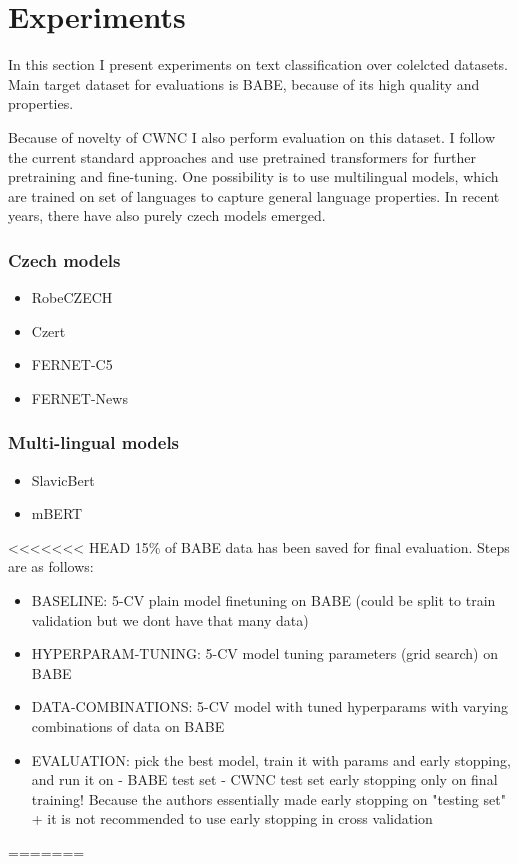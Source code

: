 \chapter{Experiments}\label{experiments}
In this section I present experiments on text classification over colelcted datasets. Main target dataset for evaluations is BABE, because of its high quality and properties.

Because of novelty of CWNC I also perform evaluation on this dataset.
I follow the current standard approaches and use pretrained transformers for further pretraining and fine-tuning. One possibility is to use multilingual models, which are trained on set of languages to capture general language properties. In recent years, there have also purely czech models emerged.
\subsection{Czech models}
\begin{itemize}
    \item RobeCZECH
    \item Czert
    \item FERNET-C5
    \item FERNET-News
\end{itemize}


\subsection{Multi-lingual models}
\begin{itemize}
    \item SlavicBert
    \item mBERT
\end{itemize}


<<<<<<< HEAD
 15\% of BABE data has been saved for final evaluation. Steps are as follows:
 \begin{itemize}
     \item BASELINE:
	5-CV plain model finetuning on BABE (could be split to train validation but we dont have that many data)
	\item HYPERPARAM-TUNING:
	5-CV model tuning parameters (grid search) on BABE
	\item DATA-COMBINATIONS:
	5-CV model with tuned hyperparams with varying combinations of data on BABE
	\item EVALUATION:
	pick the best model, train it with params and early stopping, and run it on - BABE test set 
										       - CWNC test set
	early stopping only on final training! Because the authors essentially made early stopping on "testing set" + it is not recommended to use early stopping in cross validation
 \end{itemize}
=======
